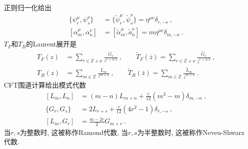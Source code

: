 正则归一化给出
\begin{subequations}
\begin{align}
    \{\psi_{r}^{\mu},\psi_{s}^{\nu}\}&=\{\tilde{\psi}_{r}^{\mu},\tilde{\psi}_{s}^{\nu}\}=\eta^{\mu\nu}\delta_{r,-s}\:,
    \label{10.2.9a} \\
    [\alpha_{m}^{\mu},\alpha_{n}^{\nu}]&=[\tilde{\alpha}_{m}^{\mu},\tilde{a}_{n}^{\nu}]=m\eta^{\mu\nu}\delta_{m,-n}\:.
    \label{10.2.9.b}
\end{align}
\end{subequations}
$T_{F} $和$ T_{B} $的Laurent展开是
\begin{subequations}
\begin{align}
    T_{F}(z)&=\sum_{r\in \mathds{Z}+\nu}\frac{G_{r}}{z^{r+3/2}}\:,  \qquad
    \tilde{T}_{F}(\bar{z})=\sum_{r\in \mathds{Z}+\nu}\frac{\tilde{G}_{r}}{\bar{z}^{r+3/2}}\:, \label{10.2.10a}\\
    T_{B}(z)&=\sum_{m\in \mathds{Z}}\frac{L_{m}}{z^{m+2}}\:, \qquad
    \tilde{T}_{B}(\bar{z})=\sum_{m\in \mathds{Z}}\frac{\tilde{L}_{m}}{\bar{z}^{m+2}} \:. \label{10.2.10b}
\end{align} \label{10.2.10}
\end{subequations}
CFT围道计算给出模式代数
\begin{subequations}
\begin{align}
    [L_{m},L_{n}] &=(m-n)L_{m+n}+\frac{c}{12}(m^{3}-m)\delta_{m,-n} \:, \label{10.2.11a} \\
    \{G_{r},G_{s}\} &=2L_{r+s}+\frac{c}{12}(4r^{2}-1)\delta_{r,-s} \:, \label{10.2.11b} \\
    [L_{m},G_{r}] &= \frac{m-2r}{2}G_{m+r} \:. \label{10.2.11c}
\end{align}
\end{subequations}
当$ r,s $为整数时, 这被称作Ramond代数, 当$ r,s $为半整数时, 这被称作Neveu-Shwarz代数.

